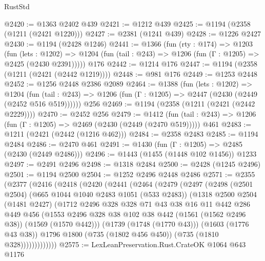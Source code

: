 \begin{lexlean}{RustStd}
\begin{coremodule}
@2420 := @1363 @2402 @439
@2421 := @1212 @439
@2425 := @1194 (@2358 (@1211 (@2421 @1220)))
@2427 := @2381 (@1241 @439)
@2428 := @1226 @2427
@2430 := @1194 (@2428 @1246)
@2441 := @1366
    (fun (rty : @174) =>
    @1203
      (fun (lets : @1202) =>
      @1204 (fun (tail : @243) => @1206 (fun (Γ : @1205) => @2425 (@2430 @2391)))))
    @176
@2442 := @1214 @176
@2447 := @1194 (@2358 (@1211 (@2421 (@2442 @1219))))
@2448 := @981 @176
@2449 := @1253 @2448
@2452 := @1256 @2448 @2386 @2089
@2464 := @1388
    (fun (lets : @1202) =>
    @1204 (fun (tail : @243) => @1206 (fun (Γ : @1205) => @2447 (@2430 (@2449 (@2452 @516 @519))))))
    @256
@2469 := @1194 (@2358 (@1211 (@2421 (@2442 @2229))))
@2470 := @2452 @256
@2479 := @1412
    (fun (tail : @243) => @1206 (fun (Γ : @1205) => @2469 (@2430 (@2449 (@2470 @519)))))
    @461
@2483 := @1211 (@2421 (@2442 (@1216 @462)))
@2484 := @2358 @2483
@2485 := @1194 @2484
@2486 := @2470 @461
@2491 := @1430 (fun (Γ : @1205) => @2485 (@2430 (@2449 @2486)))
@2496 := @1443 (@1455 (@1448 @102 @1456)) @1233
@2497 := @2491 @2496
@2498 := @1318 @2484
@2500 := @2428 (@1245 @2496)
@2501 := @1194 @2500
@2504 := @1252 @2496 @2448 @2486
@2571 := @2355
    (@2377
      (@2416
        (@2418
          (@2420
            (@2441
              (@2464
                (@2479
                  (@2497
                    (@2498
                      (@2501 @2504)
                      (@665 @1044 @1040 @2483 @1051 (@533 @2483))
                      (@1318
                        @2500
                        @2504
                        (@1481 @2427)
                        (@1712
                          @2496
                          @328
                          @328
                          @71
                          @43
                          @38
                          @16
                          @11
                          @442
                          @286
                          @449
                          @456
                          (@1553
                            @2496
                            @328
                            @38
                            @102
                            @38
                            @442
                            (@1561 (@1562 @2496 @38))
                            (@1569 (@1570 @442)))
                          (@1739 (@1748 (@1770 @43)))
                          (@1603 (@1776 @43 @38))
                          @1796
                          @1800
                          (@735 (@1802 @456 @450))
                          (@735 (@1810 @328)))))))))))))
@2575 := LexLeanPreservation.Rust.CrateOK @1064 @643 @1176

\end{coremodule}
\end{lexlean}
